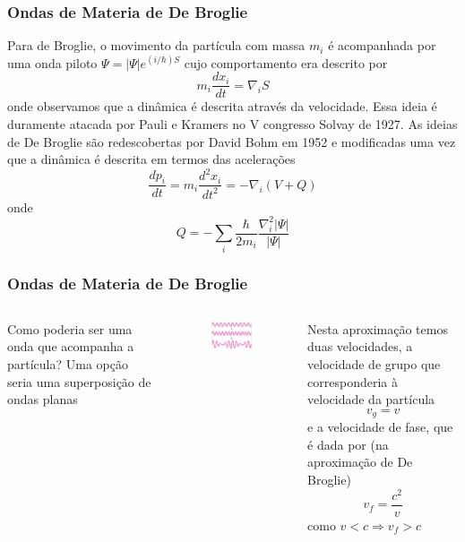 \documentclass[12pt,brazil]{beamer}
\begin{document}
    
\begin{frame}
  \frametitle{Ondas de Materia de De Broglie}
  \fontsize{10pt}{10pt}\selectfont
  
   Para de Broglie, o movimento da partícula com massa $m_i$ é acompanhada por uma onda piloto $\Psi = \left| \Psi \right|e^{(i/\hbar)S}$ cujo comportamento era descrito por
   \[
    m_i\dfrac{dx_i}{dt}=\nabla_i S
   \]
  onde observamos que a dinâmica é descrita através da velocidade. Essa ideia é duramente atacada por Pauli e Kramers no V congresso Solvay de 1927. As ideias de De Broglie são redescobertas por David Bohm em 1952 e modificadas uma vez que a dinâmica é descrita em termos das acelerações
  \[
   \dfrac{dp_i}{dt} = m_i\dfrac{d^2x_i}{dt^2}=-\nabla_i (V+Q)
  \]
  onde
  \[
    Q = -\sum_i\dfrac{\hbar}{2m_i}\dfrac{\nabla_i^2\left| \Psi \right|}{\left| \Psi \right|}
  \]

\end{frame}


    
\begin{frame}
  \frametitle{Ondas de Materia de De Broglie}
        \fontsize{11pt}{10pt}\selectfont
    \begin{columns}[c]

      \column{5cm}
  
  Como poderia ser uma onda que acompanha a partícula?  Uma opção seria uma superposição de ondas planas
  \begin{figure}
    \includegraphics[width=5cm]{figuras/fig16}
  \end{figure}
    
      \column{5cm}
      
    Nesta aproximação temos duas velocidades, a velocidade de grupo que corresponderia à velocidade da partícula
    \[
     v_g = v
    \]
    e a velocidade de fase, que é dada por (na aproximação de De Broglie)
    \[
      v_f = \dfrac{c^2}{v}
    \]
    como $v < c \Rightarrow v_f > c$



  \end{columns}
\end{frame}
\end{document}
